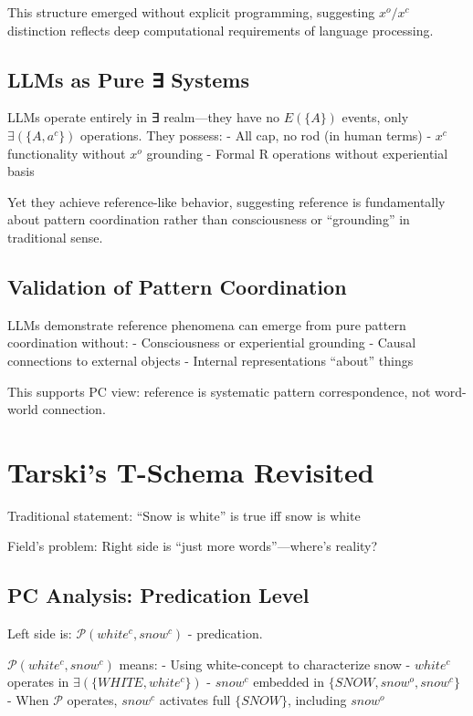 \documentclass[12pt]{article}
\begin{document}
This structure emerged without explicit programming, suggesting \(x^o/x^c\) distinction reflects deep computational requirements of language processing.

\subsection{LLMs as Pure ∃ Systems}\label{llms-as-pure-systems}

LLMs operate entirely in ∃ realm---they have no \(E(\{A\})\) events, only \(\exists(\{A, a^c\})\) operations. They possess: - All cap, no rod (in human terms) - \(x^c\) functionality without \(x^o\) grounding - Formal R operations without experiential basis

Yet they achieve reference-like behavior, suggesting reference is fundamentally about pattern coordination rather than consciousness or ``grounding'' in traditional sense.

\subsection{Validation of Pattern Coordination}\label{validation-of-pattern-coordination}

LLMs demonstrate reference phenomena can emerge from pure pattern coordination without: - Consciousness or experiential grounding - Causal connections to external objects - Internal representations ``about'' things

This supports PC view: reference is systematic pattern correspondence, not word-world connection.

\section{Tarski's T-Schema Revisited}\label{tarskis-t-schema-revisited}

Traditional statement: ``Snow is white'' is true iff snow is white

Field's problem: Right side is ``just more words''---where's reality?

\subsection{PC Analysis: Predication Level}\label{pc-analysis-predication-level}

Left side is: \(\mathcal{P}(white^c, snow^c)\) - predication.

\(\mathcal{P}(white^c, snow^c)\) means: - Using white-concept to characterize snow - \(white^c\) operates in \(\exists(\{WHITE, white^c\})\) - \(snow^c\) embedded in \(\{SNOW, snow^o, snow^c\}\) - When \(\mathcal{P}\) operates, \(snow^c\) activates full \(\{SNOW\}\), including \(snow^o\)
\end{document}
